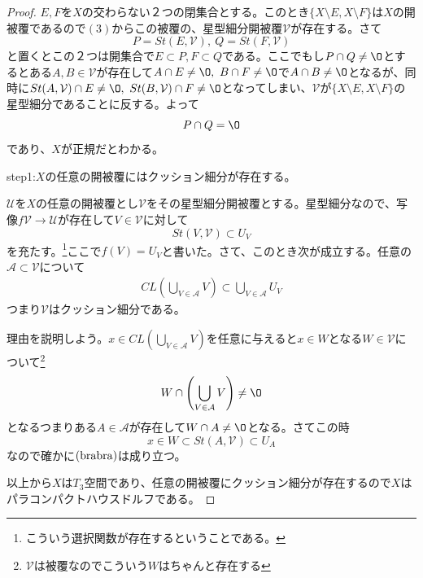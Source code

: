 \documentclass[leqno]{jsarticle}
\newcommand{\To}{\Longrightarrow}
\newcommand{\dpst}{\displaystyle}
\begin{document}
\begin{proof}
$E,F$を$X$の交わらない２つの閉集合とする。このとき$\{X\setminus E,X\setminus F\}$は$X$の開被覆であるので$(3)$からこの被覆の、星型細分開被覆$\mathcal{V}$が存在する。さて
\[
P=St(E,\mathcal{V}),\ Q=St(F,\mathcal{V})
\]と置くとこの２つは開集合で$E\subset P,F\subset Q$である。ここでもし$P\cap Q\neq \O$とするとある$A,B\in \mathcal{V}$が存在して$A\cap E\neq\O,\ B\cap F\neq \O$で$A\cap B\neq\O$となるが、同時に$St(A,\mathcal{V})\cap E\neq \O,\ St(B,\mathcal{V})\cap F\neq \O$となってしまい、$\mathcal{V}$が$\{X\setminus E,X\setminus F\}$の星型細分であることに反する。よって
\[
P\cap Q=\O
\]
であり、$X$が正規だとわかる。\par
step1:$X$の任意の開被覆にはクッション細分が存在する。\par
$\mathcal{U}$を$X$の任意の開被覆とし$\mathcal{V}$をその星型細分開被覆とする。星型細分なので、写像$f\mathcal{V}\to \mathcal{U}$が存在して$V\in \mathcal{V}$に対して
\[
St(V,\mathcal{V})\subset U_V
\]
を充たす。\footnote{こういう選択関数が存在するということである。}ここで$f(V)=U_V$と書いた。さて、このとき次が成立する。任意の$\mathcal{A}\subset \mathcal{V}$について
\begin{align}
CL\left(\bigcup_{V\in \mathcal{A}}V\right)\subset \bigcup_{V\in \mathcal{A}}U_V\tag{brabra}
\end{align}つまり$\mathcal{V}$はクッション細分である。\par
理由を説明しよう。$\dpst x\in CL\left(\bigcup_{V\in \mathcal{A}}V\right)$を任意に与えると$x\in W$となる$W\in \mathcal{V}$について\footnote{$\mathcal{V}$は被覆なのでこういう$W$はちゃんと存在する}
\[
W\cap \left(\bigcup_{V\in \mathcal{A}}V\right)\neq \O
\]
となるつまりある$A\in \mathcal{A}$が存在して$W\cap A\neq \O$となる。さてこの時
\[
x\in W\subset St(A,\mathcal{V})\subset U_A
\]
なので確かに$({\rm brabra})$は成り立つ。\par
以上から$X$は$T_3$空間であり、任意の開被覆にクッション細分が存在するので$X$はパラコンパクトハウスドルフである。
\par[$(3)\To(1)$の証明終わり]\par  
\end{proof}
\end{document}
